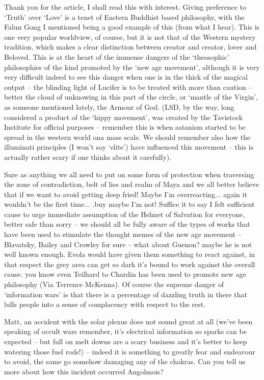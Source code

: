 \begin{footnotesize}
\begin{sffamily}
Thank you for the article, I shall read this with interest. Giving preference to `Truth' over `Love' is a tenet of Eastern Buddhist based philosophy, with the Falun Gong I mentioned being a good example of this (from what I hear). This is one very popular worldview, of course, but it is not that of the Western mystery tradition, which makes a clear distinction between creator and creator, lover and Beloved. This is at the heart of the immense dangers of the `theosophic' philosophies of the kind promoted by the `new age movement', although it is very very difficult indeed to see this danger when one is in the thick of the magical output -- the blinding light of Lucifer is to be treated with more than caution -- better the cloud of unknowing in this part of the circle, or `mantle of the Virgin', as someone mentioned lately, the Armour of God. (LSD, by the way, long considered a product of the `hippy movement', was created by the Tavistock Institute for official purposes -- remember this is when satanism started to be spread in the western world ona mass scale. We should remember also how the illuminati principles (I won't say `elite') have influenced this movement -- this is actually rather scary if one thinks about it carefully).

Sure as anything we all need to put on some form of protection when traversing the zone of contradiction, belt of lies and realm of Maya and we all better believe that if we want to avoid getting deep fried! Maybe I'm overreacting... again it wouldn't be the first time... .buy maybe I'm not! Suffice it to say I felt sufficient cause to urge immediate assumption of the Helmet of Salvation for everyone, better safe than sorry -- we should all be fully aware of the types of works that have been used to stimulate the thought memes of the new age movement -- Blavatsky, Bailey and Crowley for sure -- what about Guenon? maybe he is not well known enough. Evola would have given them something to react against, in that respect the grey area can get so dark it's bound to work against the overall cause. you know even Teilhard to Chardin has been used to promote new age philosophy (Via Terrence McKenna). Of course the supreme danger of `information wars' is that there is a percentage of dazzling truth in there that lulls people into a sense of complacency with respect to the rest.

Matt, an accident with the solar plexus does not sound great at all (we've been speaking of occult wars remember, it's electrical information so sparks can be expected -- but full on melt downs are a scary business and it's better to keep watering those fuel rods!) -- indeed it is something to greatly fear and endeavour to avoid, the same go somehow damaging any of the chakras. Can you tell us more about how this incident occurred Angolmois?


\end{sffamily}
\end{footnotesize}
